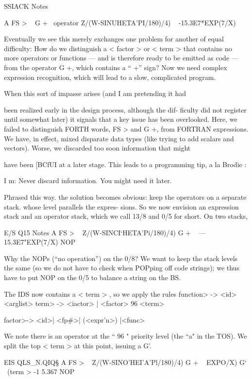  

SSIACK Notes

A FS > \ < subject >
G + \ operator
Z/(W-SINUHETA'PI/180)/4) \ < term >
-15.3E7*EXP(7/X) \ < term >

Eventually we see this merely exchanges one problem for another
of equal difficulty: How do we distinguish a < factor > or
< term > that contains no more operators or functions — and is
therefore ready to be emitted as code — from the operator G +,
which contains a “ +” sign? Now we need complex expression
recognition, which will lead to a slow, complicated program.

When this sort of impasse arises (and I am pretending it had

been realized early in the design process, although the dif-
ficulty did not register until somewhat later) it signals that a key
issue has been overlooked. Here, we failed to distinguish FORTH
words, FS > and G +, from FORTRAN expressions. We have, in
effect, mixed disparate data types (like trying to add scalars and
vectors). Worse, we discarded too soon information that might

have been [BCfUI at a later stage. This leads to a programming tip,
a la Brodie :

I m: Never discard information. You might need it later.

Phrased this way. the solution becomes obvious: keep the
operators on a separate stack. whose level parallels the expres-
sions. So we now envision an expression stack and an operator
stack, which we call 13/8 and 0/5 for short. On two stacks,

 

E/S Q15 Notes
A FS > \ < subject >
Z/(W-SINCI‘HETA'Pi/180)/4) G + \ < term >
—15.3E7"EXP(7/X) NOP \ < term >

Why the NOPs (“no operation”) on the 0/8? We want to keep
the stack levels the same (so we do not have to check when
POPping off code strings); we thus have to put NOP on the 0/5
to balance a string on the BS.

The IDS now contains a < term > , so we apply the rules
\<function> -> <id> <arglist>
\<term> -> <iactor> | <factor> 96 <term>

\<factor>-> <id>| <fp#>| (<expr’n>) |<func>

We note there is an operator at the “ 96 " priority level (the “a"
in the TOS). We split the top < term > at this point, issuing a G'.

 

EIS QLS_N.QIQ§
A FS > \ < subject >
Z/(W-SINO’HEI'A'Pl/180)/4) G + \ < term >
EXPO/X) G‘ \ (term >
-1 5.367 NOP


